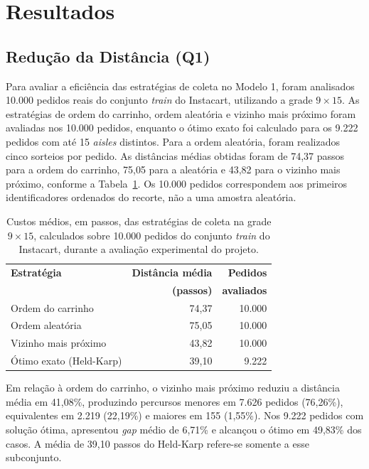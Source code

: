 \section{Resultados}
\label{resultados}

\subsection{Redução da Distância (Q1)}
\label{ssec:q1}

Para avaliar a eficiência das estratégias de coleta no Modelo 1, foram analisados 10.000 pedidos reais do conjunto \textit{train} do Instacart, utilizando a grade $9 \times 15$. As estratégias de ordem do carrinho, ordem aleatória e vizinho mais próximo foram avaliadas nos 10.000 pedidos, enquanto o ótimo exato foi calculado para os 9.222 pedidos com até 15 \textit{aisles} distintos. Para a ordem aleatória, foram realizados cinco sorteios por pedido. As distâncias médias obtidas foram de 74,37 passos para a ordem do carrinho, 75,05 para a aleatória e 43,82 para o vizinho mais próximo, conforme a Tabela~\ref{tab:custos}. Os 10.000 pedidos correspondem aos primeiros identificadores ordenados do recorte, não a uma amostra aleatória.

\begin{table}[!ht]
\caption{Custos médios, em passos, das estratégias de coleta na grade $9 \times 15$, calculados sobre 10.000 pedidos do conjunto \textit{train} do Instacart, durante a avaliação experimental do projeto.}
\label{tab:custos}
\centering
\small
\begin{tabular}{lrr}
\hline
\textbf{Estratégia} & \textbf{Distância média} & \textbf{Pedidos} \\
 & \textbf{(passos)} & \textbf{avaliados} \\ \hline
Ordem do carrinho & 74,37 & 10.000 \\
Ordem aleatória & 75,05 & 10.000 \\
Vizinho mais próximo & 43,82 & 10.000 \\
Ótimo exato (Held-Karp) & 39,10 & 9.222 \\ \hline
\end{tabular}
\end{table}

Em relação à ordem do carrinho, o vizinho mais próximo reduziu a distância média em 41,08\%, produzindo percursos menores em 7.626 pedidos (76,26\%), equivalentes em 2.219 (22,19\%) e maiores em 155 (1,55\%). Nos 9.222 pedidos com solução ótima, apresentou \textit{gap} médio de 6,71\% e alcançou o ótimo em 49,83\% dos casos. A média de 39,10 passos do Held-Karp refere-se somente a esse subconjunto.

